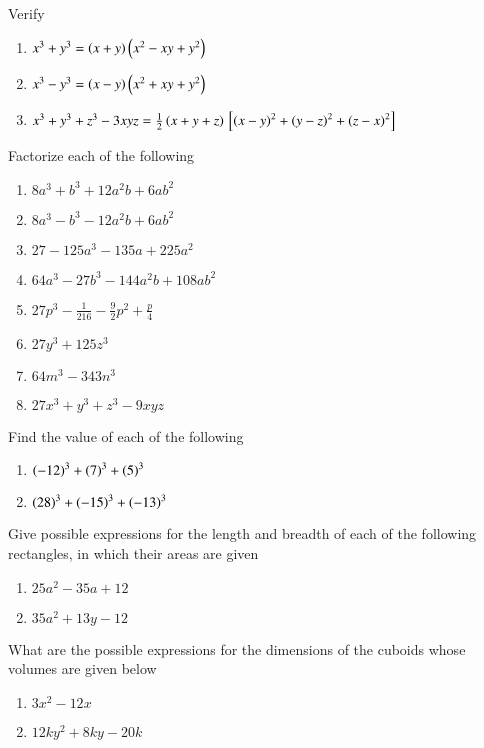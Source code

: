 Verify
\begin{enumerate}[label=\thesubsection.\arabic*.,ref=\thesubsection.\theenumi,resume*]
	\item $x^3+y^3 = \left(x+y\right)\left(x^2-xy+y^2\right)$
	\item $x^3-y^3 = \left(x-y\right)\left(x^2+xy+y^2\right)$
	\item $x^3+y^3+z^3-3xyz = \frac{1}{2}\left(x+y+z\right){}\left[\left(x-y\right)^{2}+\left(y-z\right)^{2}+\left(z-x\right)^{2}\right]$
\end{enumerate}
Factorize each of the following
\begin{enumerate}[label=\thesubsection.\arabic*.,ref=\thesubsection.\theenumi]
	\item $8a^3+b^3+12a^2b+6ab^2$
	\item $8a^3-b^3-12a^2b+6ab^2$
	\item $27-125a^3-135a+225a^2$
	\item $64a^3-27b^3-144a^2b+108ab^2$
	\item $27p^3-\frac{1}{216}-\frac{9}{2}p^2 + \frac{p}{4}$
	\item $27y^3+125z^3$ 
	\item $64m^3-343n^3$
	\item $27x^3+y^3+z^3-9xyz$
\end{enumerate}
Find the value of each of the following 
\begin{enumerate}[label=\thesubsection.\arabic*.,ref=\thesubsection.\theenumi,resume*]
	\item $\left(-12\right)^3+\left(7\right)^3+\left(5\right)^3$
	\item $\left(28\right)^3+\left(-15\right)^3+\left(-13\right)^3$
\end{enumerate}
Give possible expressions for the length and breadth of each of the following rectangles, in which their areas are given
\begin{enumerate}[label=\thesubsection.\arabic*.,ref=\thesubsection.\theenumi,resume*]
	\item $25a^2-35a+12$
	\item $35a^2+13y-12$
\end{enumerate}
What are the possible expressions for the dimensions of the cuboids whose volumes are given below
\begin{enumerate}[label=\thesubsection.\arabic*.,ref=\thesubsection.\theenumi,resume*]
	\item $3x^2-12x$
	\item $12ky^2+8ky-20k$
\end{enumerate}
